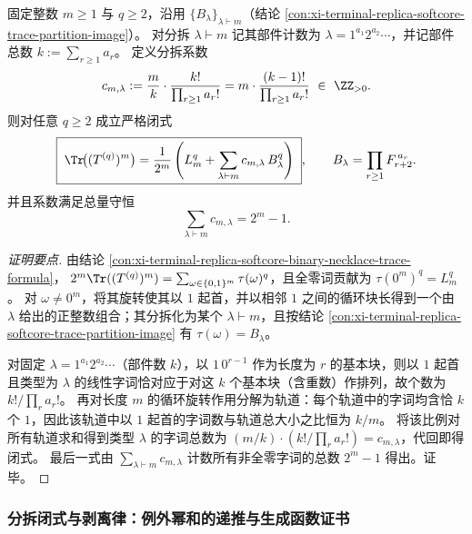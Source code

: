 \begin{conclusion}\label{con:xi-terminal-replica-softcore-partition-trace-closed-form}
固定整数 \(m\ge 1\) 与 \(q\ge 2\)，沿用 \(\{B_\lambda\}_{\lambda\vdash m}\)（结论 \ref{con:xi-terminal-replica-softcore-trace-partition-image}）。
对分拆 \(\lambda\vdash m\) 记其部件计数为 \(\lambda=1^{a_1}2^{a_2}\cdots\)，并记部件总数 \(k:=\sum_{r\ge1}a_r\)。
定义分拆系数
\[
c_{m,\lambda}:=\frac{m}{k}\cdot\frac{k!}{\prod_{r\ge1}a_r!}
= m\cdot\frac{(k-1)!}{\prod_{r\ge1}a_r!}\ \in\ \ZZ_{>0}.
\]
则对任意 \(q\ge 2\) 成立严格闭式
\[
\boxed{\;
\Tr\!\bigl((T^{(q)})^m\bigr)
=\frac1{2^m}\left(L_m^{q}+\sum_{\lambda\vdash m}c_{m,\lambda}\,B_\lambda^{q}\right)\; } ,
\qquad
B_\lambda=\prod_{r\ge1}F_{r+2}^{\,a_r}.
\]
并且系数满足总量守恒
\[
\sum_{\lambda\vdash m}c_{m,\lambda}=2^m-1.
\]
\end{conclusion}
\begin{proof}[证明要点]
由结论 \ref{con:xi-terminal-replica-softcore-binary-necklace-trace-formula}，
\(
2^{m}\Tr((T^{(q)})^m)=\sum_{\omega\in\{0,1\}^m}\tau(\omega)^q
\)，且全零词贡献为 \(\tau(0^m)^q=L_m^q\)。
对 \(\omega\neq 0^m\)，将其旋转使其以 \(1\) 起首，并以相邻 \(1\) 之间的循环块长得到一个由 \(\lambda\) 给出的正整数组合；其分拆化为某个 \(\lambda\vdash m\)，且按结论 \ref{con:xi-terminal-replica-softcore-trace-partition-image} 有 \(\tau(\omega)=B_\lambda\)。
\par
对固定 \(\lambda=1^{a_1}2^{a_2}\cdots\)（部件数 \(k\)），以 \(1\,0^{r-1}\) 作为长度为 \(r\) 的基本块，则以 \(1\) 起首且类型为 \(\lambda\) 的线性字词恰对应于对这 \(k\) 个基本块（含重数）作排列，故个数为 \(k!/\prod_r a_r!\)。
再对长度 \(m\) 的循环旋转作用分解为轨道：每个轨道中的字词均含恰 \(k\) 个 \(1\)，因此该轨道中以 \(1\) 起首的字词数与轨道总大小之比恒为 \(k/m\)。
将该比例对所有轨道求和得到类型 \(\lambda\) 的字词总数为 \((m/k)\cdot(k!/\prod_r a_r!)=c_{m,\lambda}\)，代回即得闭式。
最后一式由 \(\sum_{\lambda\vdash m}c_{m,\lambda}\) 计数所有非全零字词的总数 \(2^m-1\) 得出。证毕。
\end{proof}

\subsubsection{分拆闭式与剥离律：例外幂和的递推与生成函数证书}\label{subsubsec:xi-exceptional-partition-peeling-recurrence}



